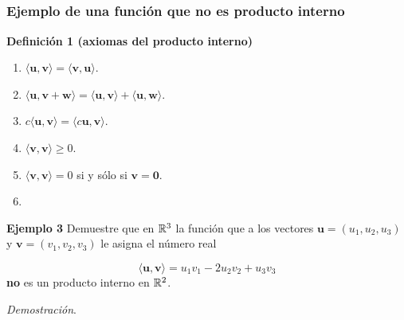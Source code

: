 
\subsection{}

\begin{frame}\frametitle{Ejemplo de una función que no es producto interno}
	
	\begin{block}{\textbf{Definición 1 (axiomas del producto interno)}}	
		\begin{multicols}{2}		
			\begin{enumerate}			
				\justifying
				\item[\labelname{$a$}] $\langle \mathbf{u}, \mathbf{v}\rangle = \langle \mathbf{v}, \mathbf{u}\rangle$. \\%
				\item[\labelname{$b$}] $\langle \mathbf{u}, \mathbf{v}+\mathbf{w}\rangle 
				= \langle \mathbf{u}, \mathbf{v}\rangle + \langle \mathbf{u}, \mathbf{w}\rangle$. \\%
				\item[\labelname{$c$}] $c\langle \mathbf{u}, \mathbf{v}\rangle = \langle c\mathbf{u}, \mathbf{v}\rangle$.\\
				\columnbreak
				\item[\labelname{$d$}] $\langle \mathbf{v}, \mathbf{v}\rangle \geq 0 $. 
				\item[\labelname{$e$}] $\langle \mathbf{v}, \mathbf{v}\rangle = 0 $ si y sólo si $\mathbf{v}=\mathbf{0}$. 
				\item[]
			\end{enumerate}		
		\end{multicols}
		
	\end{block}
	
	\begin{ej}{\textbf{Ejemplo 3}}\justifying
		Demuestre que en $\mathbb{R}^3$ la función que a los vectores $\mathbf{u}=(u_1,u_2,u_3)$ y 
		$\mathbf{v}=(v_1,v_2,v_3)$ le asigna el número real
		
		\vspace{-2mm}
		\[
		\langle \mathbf{u}, \mathbf{v}\rangle = u_1v_1 - 2u_2v_2 + u_3v_3
		\]
		\textbf{no} es un producto interno en $\mathbb{R}^2$.
	\end{ej}
	\textit{Demostración}.
	
\end{frame}

